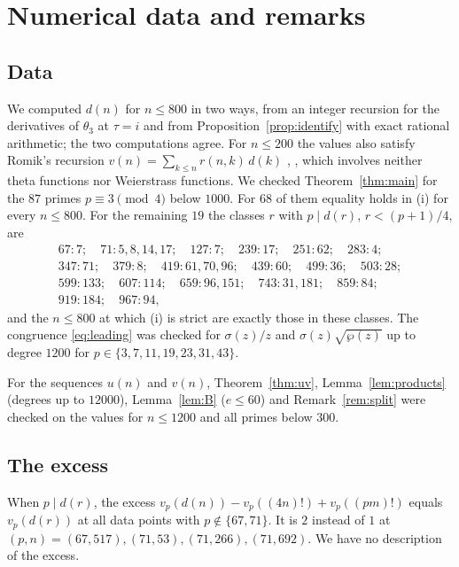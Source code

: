 \documentclass[11pt]{amsart}
\theoremstyle{definition}
\theoremstyle{remark}
\begin{document}
\section{Numerical data and remarks}\label{sec:numerics}

\subsection{Data} We computed $d(n)$ for $n\le800$ in two ways, from an integer recursion for the
derivatives of $\theta_3$ at $\tau=i$ and from Proposition~\ref{prop:identify} with exact
rational arithmetic; the two computations agree. For $n\le200$ the values also satisfy Romik's
recursion $v(n)=\sum_{k\le n}r(n,k)\,d(k)$ \cite[Theorem~7]{Romik}, \cite[(2.8)]{KM}, which
involves neither theta functions nor Weierstrass functions. We checked
Theorem~\ref{thm:main} for the $87$ primes $p\equiv3\pmod4$ below $1000$. For $68$ of them
equality holds in (i) for every $n\le800$. For the remaining $19$ the classes $r$ with
$p\mid d(r)$, $r<(p+1)/4$, are
\begin{gather*}
67\colon 7;\quad 71\colon 5,8,14,17;\quad 127\colon 7;\quad 239\colon 17;\quad 251\colon 62;\quad
283\colon 4;\\
347\colon 71;\quad 379\colon 8;\quad
419\colon 61,70,96;\quad 439\colon 60;\quad 499\colon 36;\quad 503\colon 28;\\
599\colon 133;\quad 607\colon 114;\quad 659\colon 96,151;\quad
743\colon 31,181;\quad 859\colon 84;\\
919\colon 184;\quad 967\colon 94,
\end{gather*}
and the $n\le800$ at which (i) is strict are exactly those in these classes. The congruence
\eqref{eq:leading} was checked
for $\sigma(z)/z$ and $\sigma(z)\sqrt{\wp(z)}$ up to degree $1200$ for $p\in\{3,7,11,19,23,31,43\}$.

For the sequences $u(n)$ and $v(n)$, Theorem~\ref{thm:uv}, Lemma~\ref{lem:products} (degrees up to
$12000$), Lemma~\ref{lem:B} ($e\le60$) and Remark~\ref{rem:split} were checked on the values for
$n\le1200$ and all primes below $300$.

\subsection{The excess} When $p\mid d(r)$, the excess
$v_p(d(n))-v_p((4n)!)+v_p((pm)!)$ equals $v_p(d(r))$ at all data points with $p\notin\{67,71\}$.
It is $2$ instead of $1$ at $(p,n)=(67,517),(71,53),(71,266),(71,692)$. We have no description of
the excess.
\end{document}

